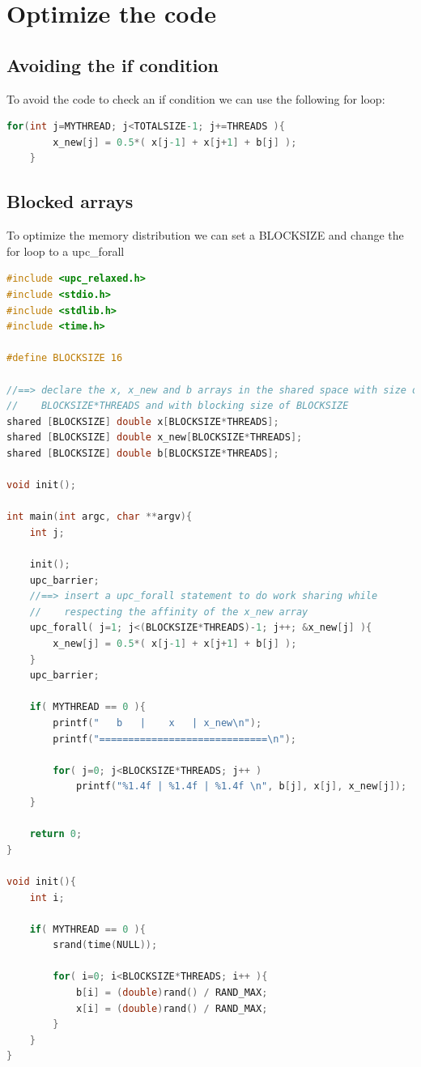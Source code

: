 \documentclass{report}
\begin{document}
\section{Optimize the code}

\subsection{Avoiding the if condition}
To avoid the code to check an if condition we can use the following for loop:

\begin{lstlisting}[language=C]
    for(int j=MYTHREAD; j<TOTALSIZE-1; j+=THREADS ){
        x_new[j] = 0.5*( x[j-1] + x[j+1] + b[j] );
    }
\end{lstlisting}

\subsection{Blocked arrays}

To optimize the memory distribution we can set a BLOCKSIZE and change the for loop to a upc\_forall 

\begin{lstlisting}[language=C]
#include <upc_relaxed.h>
#include <stdio.h>
#include <stdlib.h>
#include <time.h>

#define BLOCKSIZE 16

//==> declare the x, x_new and b arrays in the shared space with size of 
//    BLOCKSIZE*THREADS and with blocking size of BLOCKSIZE
shared [BLOCKSIZE] double x[BLOCKSIZE*THREADS];
shared [BLOCKSIZE] double x_new[BLOCKSIZE*THREADS];
shared [BLOCKSIZE] double b[BLOCKSIZE*THREADS];

void init();

int main(int argc, char **argv){
    int j;

    init();
    upc_barrier;
    //==> insert a upc_forall statement to do work sharing while 
    //    respecting the affinity of the x_new array
    upc_forall( j=1; j<(BLOCKSIZE*THREADS)-1; j++; &x_new[j] ){
        x_new[j] = 0.5*( x[j-1] + x[j+1] + b[j] );
    }
    upc_barrier;

    if( MYTHREAD == 0 ){
        printf("   b   |    x   | x_new\n");
        printf("=============================\n");

        for( j=0; j<BLOCKSIZE*THREADS; j++ )
            printf("%1.4f | %1.4f | %1.4f \n", b[j], x[j], x_new[j]);
    }

    return 0;
}

void init(){
    int i;

    if( MYTHREAD == 0 ){
        srand(time(NULL));

        for( i=0; i<BLOCKSIZE*THREADS; i++ ){
            b[i] = (double)rand() / RAND_MAX;
            x[i] = (double)rand() / RAND_MAX;
        }
    }
}


\end{lstlisting}
\end{document}

